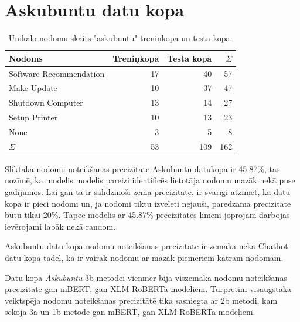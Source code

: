 \section{Askubuntu datu kopa}

\begin{table}[htbp]
  \centering
  \caption{Unikālo nodomu skaits "askubuntu" treniņkopā un testa kopā.}
    \begin{tabular}{lrrr} \toprule
    Nodoms & Treniņkopā & Testa kopā & $\Sigma$ \\\midrule
    Software Recommendation & 17    & 40 & 57 \\
    Make Update & 10    & 37 & 47 \\
    Shutdown Computer & 13    & 14 & 27 \\
    Setup Printer & 10    & 13 & 23\\
    None  & 3     & 5 & 8\\
   $\Sigma$ & 53    & 109 & 162 \\\bottomrule
    \end{tabular}%
  \label{tab:askubuntu-labels}%
\end{table}%



Sliktākā nodomu noteikšanas precizitāte Askubuntu datukopā ir 45.87\%, tas nozīmē, ka modelis modelis pareizi identificēs lietotāja nodomu mazāk nekā puse gadījumos. Lai gan tā ir salīdzinoši zema precizitāte, ir svarīgi atzīmēt, ka datu kopā ir pieci nodomi un, ja nodomi tiktu izvēlēti nejauši, paredzamā precizitāte būtu tikai 20\%. Tāpēc modelis ar 45.87\% precizitātes līmeni joprojām darbojas ievērojami labāk nekā random.

Askubuntu datu kopā nodomu noteikšanas precizitāte ir zemāka nekā Chatbot datu kopā tādeļ, ka ir vairāk nodomu ar mazāk piemēriem katram nodomam.

Datu kopā \textit{Askubuntu} 3b metodei vienmēr bija viszemākā nodomu noteikšanas precizitāte gan mBERT, gan XLM-RoBERTa modeļiem. Turpretim visaugstākā veiktspēja nodomu noteikšanas precizitātē tika sasniegta ar 2b metodi, kam sekoja 3a un 1b metode gan mBERT, gan XLM-RoBERTa modeļiem.



